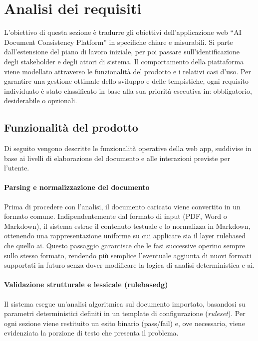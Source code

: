 \chapter{Analisi dei requisiti}
\label{cap:analisi-requisiti}

L'obiettivo di questa sezione è tradurre gli obiettivi dell'applicazione web “AI Document Consistency Platform” in specifiche chiare e misurabili. Si parte dall'estensione del piano di lavoro iniziale, per poi passare sull'identificazione degli stakeholder e degli attori di sistema. Il comportamento della piattaforma viene modellato attraverso le funzionalità del prodotto e i relativi casi d'uso. Per garantire una gestione ottimale dello sviluppo e delle tempistiche, ogni requisito individuato è stato classificato in base alla sua priorità esecutiva in: obbligatorio, desiderabile o opzionali.

\section{Funzionalità del prodotto}
Di seguito vengono descritte le funzionalità operative della web app, suddivise in base ai livelli di elaborazione del documento e alle interazioni previste per l'utente. 

\subsubsection{Parsing e normalizzazione del documento}
Prima di procedere con l'analisi, il documento caricato viene convertito in un formato comune. Indipendentemente dal formato di input (PDF, Word o Markdown), il sistema estrae il contenuto testuale e lo normalizza in Markdown, ottenendo una rappresentazione uniforme su cui applicare sia il layer rulebased che quello ai. Questo passaggio garantisce che le fasi successive operino sempre sullo stesso formato, rendendo più semplice l'eventuale aggiunta di nuovi formati supportati in futuro senza dover modificare la logica di analisi deterministica e ai.

\subsubsection{Validazione strutturale e lessicale (\gls{rulebasedg})}
Il sistema esegue un'analisi algoritmica sul documento importato, basandosi su parametri deterministici definiti in un template di configurazione (\emph{ruleset}). Per ogni sezione viene restituito un esito binario (pass/fail) e, ove necessario, viene evidenziata la porzione di testo che presenta il problema.\\

